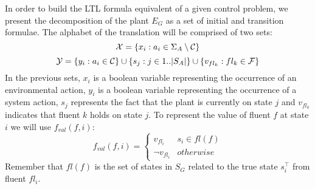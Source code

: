 %
In order to build the LTL formula equivalent of a given control problem, we present the decomposition of the plant $E_G$ as a set of initial and transition formulae.
The alphabet of the translation will be comprised of two sets:
\[{\mathcal{X}} = \{x_i : a_i \in \Sigma_A \setminus \mathcal{C} \}\]
\[{\mathcal{Y}} = \{y_i : a_i \in \mathcal{C} \} \cup \{s_j : j \in 1..|S_A| \} \cup \{v_{fl_k} : fl_k \in \mathcal{F}\}\]
In the previous sets, $x_i$ is a boolean variable representing the occurrence of an environmental action, $y_i$ is a boolean variable representing the occurrence of a system action, $s_j$ represents the fact that the plant is currently on state $j$ and $v_{fl_k}$ indicates that fluent $k$ holds on state $j$.
To represent the value of fluent $f$ at state $i$ we will use $f_{val}(f,i)$:
\[
f_{val}(f,i) = \begin{cases}
v_{fl_i} & s_i \in fl(f) \\
\neg v_{fl_i} & otherwise
\end{cases}
\]
Remember that $fl(f)$ is the set of states in $S_G$ related to the true state $s^{\top}_i$ from fluent $fl_i$.

